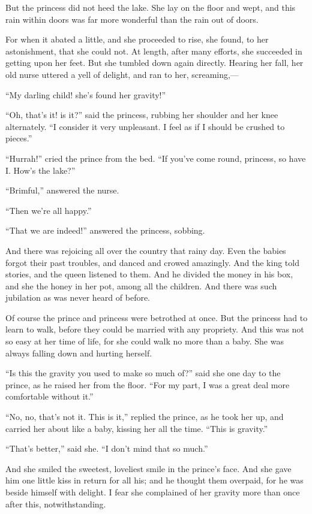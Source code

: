 \documentclass[12pt]{memoir}
\begin{document}
But the princess did not heed the lake.  She lay on the floor and
wept, and this rain within doors was far more wonderful than the rain
out of doors.

For when it abated a little, and she proceeded to rise, she found, to
her astonishment, that she could not.  At length, after many efforts,
she succeeded in getting upon her feet.  But she tumbled down again
directly.  Hearing her fall, her old nurse uttered a yell of delight,
and ran to her, screaming,---

``My darling child! she's found her gravity!''

``Oh, that's it! is it?'' said the princess, rubbing her shoulder and
her knee alternately.  ``I consider it very unpleasant.  I feel as if
I should be crushed to pieces.''

``Hurrah!'' cried the prince from the bed.  ``If you've come round,
princess, so have I.  How's the lake?''

``Brimful,'' answered the nurse.

``Then we're all happy.''

``That we are indeed!'' answered the princess, sobbing.

And there was rejoicing all over the country that rainy day.  Even the
babies forgot their past troubles, and danced and crowed amazingly.
And the king told stories, and the queen listened to them.  And he
divided the money in his box, and she the honey in her pot, among all
the children.  And there was such jubilation as was never heard of
before.

Of course the prince and princess were betrothed at once.  But the
princess had to learn to walk, before they could be married with any
propriety.  And this was not so easy at her time of life, for she
could walk no more than a baby.  She was always falling down and
hurting herself.

``Is this the gravity you used to make so much of?'' said she one day
to the prince, as he raised her from the floor.  ``For my part, I was
a great deal more comfortable without it.''

``No, no, that's not it.  This is it,'' replied the prince, as he took
her up, and carried her about like a baby, kissing her all the time.
``This is gravity.''

``That's better,'' said she.  ``I don't mind that so much.''

And she smiled the sweetest, loveliest smile in the prince's face.
And she gave him one little kiss in return for all his; and he thought
them overpaid, for he was beside himself with delight.  I fear she
complained of her gravity more than once after this, notwithstanding.
\end{document}
